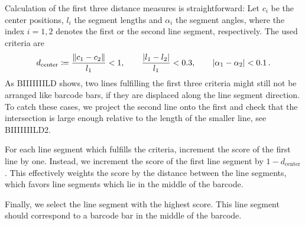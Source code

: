 Calculation of the first three distance measures is straightforward: Let $c_i$
be the center positions, $l_i$ the segment lengths and $\alpha_i$ the segment angles, where the index $i=1,2$
denotes the first or the second line segment, respectively. The used criteria are
\begin{equation*}
d_{\text{center}}\coloneqq\frac{\lVert c_1-c_2\rVert}{l_1}<1,\qquad \frac{\lvert l_1-l_2\rvert}{l_1}<0.3,\qquad \lvert\alpha_1-\alpha_2\rvert<0.1\,.
\end{equation*}
As BIIIIIIILD shows, two lines fulfilling the first three criteria might
still not be arranged like barcode bars, if they are displaced along the line
segment direction. To catch these cases, we project the second line onto the
first and check that the intersection is large enough relative to the length of
the smaller line, see BIIIIIIILD2.

For each line segment which fulfills the criteria, \citeauthor{Creusot2016}
increment the score of the first line by one. Instead, we increment the score of the
first line segment by $1-d_{\text{center}}$. This effectively weights the score by the distance
between the line segments, which favors line segments which lie in
the middle of the barcode.

Finally, we select the line segment with the highest score. This line segment
should correspond to a barcode bar in the middle of the barcode.

